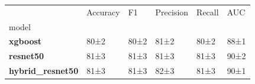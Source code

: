 \begin{tabular}{llllll}
\toprule
 & Accuracy & F1 & Precision & Recall & AUC \\
model &  &  &  &  &  \\
\midrule
\textbf{xgboost} & 80±2 & 80±2 & 81±2 & 80±2 & 88±1 \\
\textbf{resnet50} & 81±3 & 81±3 & 81±3 & 81±3 & 90±2 \\
\textbf{hybrid_resnet50} & 81±3 & 81±3 & 82±3 & 81±3 & 90±1 \\
\bottomrule
\end{tabular}
